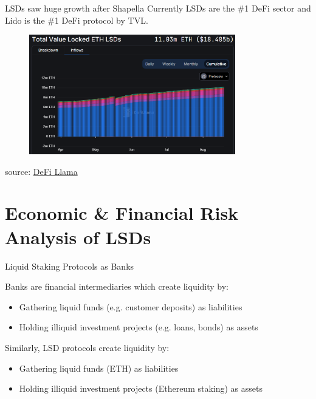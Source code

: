 \documentclass{beamer}
\begin{document}
\begin{frame}{LSDs saw huge growth after Shapella}
    Currently LSDs are the \#1 DeFi sector and Lido is the \#1 DeFi protocol by TVL.
    \begin{figure}
        \centering
        \includegraphics[width=0.8\textwidth]{figures/lsd_2023.png}
    \end{figure}
    \tiny{source: \href{https://defillama.com/lsd}{DeFi Llama}}
    
\end{frame}

\section[Economic Analysis]{Economic \& Financial Risk Analysis of LSDs}
\begin{frame}{Liquid Staking Protocols as Banks}

    \footnotemark Banks are financial intermediaries which create liquidity by:

    \begin{itemize}
        \item Gathering liquid funds (e.g. customer deposits) as liabilities
        \item Holding illiquid investment projects (e.g. loans, bonds) as assets
    \end{itemize}
    \bigskip
    Similarly, LSD protocols create liquidity by:
    \begin{itemize}
        \item Gathering liquid funds (ETH) as liabilities
        \item Holding illiquid investment projects (Ethereum staking) as assets
    \end{itemize}


\end{frame}
\end{document}
